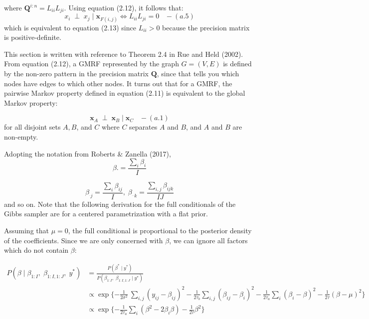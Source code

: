 \documentclass[]{article}
\begin{document}
where \(\boldsymbol{Q}^{i:n} = L_{ii} L_{ji}\). Using equation (2.12),
it follows that:
\[x_i \; \perp \; x_j \;|\; \boldsymbol{x}_{F(i,j)} \iff L_{ii}L_{ji}=0 \;\;\; - (a.5)\]
which is equivalent to equation (2.13) since \(L_{ii}>0\) because the
precision matrix is positive-definite. \newline \newline \newline

 \newline 

This section is written with reference to Theorem 2.4 in Rue and Held
(2002). From equation (2.12), a GMRF represented by the graph
\(G = (V,E)\) is defined by the non-zero pattern in the precision matrix
\(\boldsymbol{Q}\), since that tells you which nodes have edges to which
other nodes. It turns out that for a GMRF, the pairwise Markov property
defined in equation (2.11) is equivalent to the global Markov property:

\[\boldsymbol{x}_A \; \perp \; \boldsymbol{x}_B \;|\; \boldsymbol{x}_{C} \;\;\; - (a.1) \]
for all disjoint sets \(A, B\), and \(C\) where \(C\) separates \(A\)
and \(B\), and \(A\) and \(B\) are non-empty. \newline \newline \newline

 \newline 

Adopting the notation from Roberts \& Zanella (2017),
\[\beta. = \frac{\sum_i\beta_i}{I}\]

\[\beta_{^.j} = \frac{\sum_i\beta_{ij}}{I}, \; \beta_{^{..}k} = \frac{\sum_{i,j}\beta_{ijk}}{IJ}\]
and so on. Note that the following derivation for the full conditionals
of the Gibbs sampler are for a centered parametrization with a flat
prior.

Assuming that \(\mu=0\), the full conditional is proportional to the
posterior density of the coefficients. Since we are only concerned with
\(\beta\), we can ignore all factors which do not contain \(\beta\):

\[
\begin{aligned}
P(\beta \;|\; \beta_{1:I}, \; \beta_{1:I,1:J}, \; y^*) &= \frac{P(\beta^* \;|\; y^*)}{P(\beta_{1:I},\; \beta_{1:I, 1:J}\;|\; y^*)} \\
&\propto \exp \{-\frac{1}{2\sigma^2}\ \sum_{i,j} (y_{ij}-\beta_{ij})^2 - \frac{1}{2\tau_b}\sum_{i,j} (\beta_{ij}-\beta_{i})^2 -\frac{1}{2\tau_a} \sum_{i} (\beta_{i}-\beta)^2 - \frac{1}{2\tau}(\beta - \mu)^2 \}\\
&\propto \exp \{ -\frac{1}{2\tau_a} \sum_i (\beta^2 -2\beta_i\beta) - \frac{1}{2\tau}\beta^2\}
\end{aligned}
\]
\end{document}
